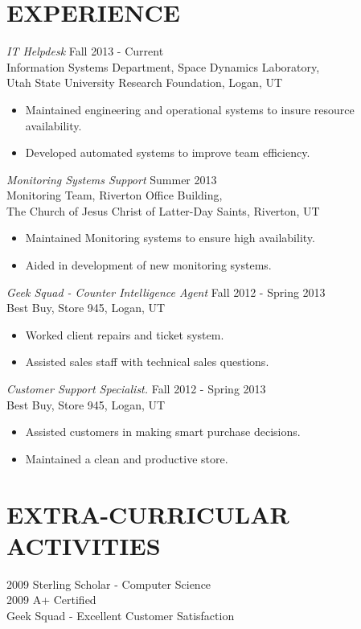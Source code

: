 \documentclass[line,margin]{res}
\begin{document}
\begin{resume}
\section{EXPERIENCE} {\sl IT Helpdesk} \hfill Fall 2013 - Current \\
                Information Systems Department, Space Dynamics Laboratory,  \\
                Utah State University Research Foundation, Logan, UT
                 \begin{itemize}  \itemsep -2pt %
                 \item Maintained engineering and operational systems to insure resource availability. \\
                 \item Developed automated systems to improve team efficiency.
                \end{itemize}

                {\sl Monitoring Systems Support} \hfill Summer 2013 \\
                Monitoring Team, Riverton Office Building, \\
                The Church of Jesus Christ of Latter-Day Saints, Riverton, UT
                 \begin{itemize}  \itemsep -2pt %
                 \item Maintained Monitoring systems to ensure high availability.
                 \item Aided in development of new monitoring systems.
                 \end{itemize}

                {\sl Geek Squad - Counter Intelligence Agent} \hfill Fall 2012 - Spring 2013 \\
                Best Buy, Store 945, Logan, UT
                  \begin{itemize}
                   \item Worked client repairs and ticket system.
                   \item Assisted sales staff with technical sales questions.
                   \end{itemize}

                {\sl Customer Support Specialist.} \hfill Fall 2012 - Spring 2013 \\
                Best Buy, Store 945, Logan, UT
                  \begin{itemize}
                   \item Assisted customers in making smart purchase decisions.
                   \item Maintained a clean and productive store.
                   \end{itemize}

\section{EXTRA-CURRICULAR \\ ACTIVITIES}
            2009 Sterling Scholar - Computer Science \\
            2009 A+ Certified \\
            Geek Squad - Excellent Customer Satisfaction


\end{resume}
\end{document}
